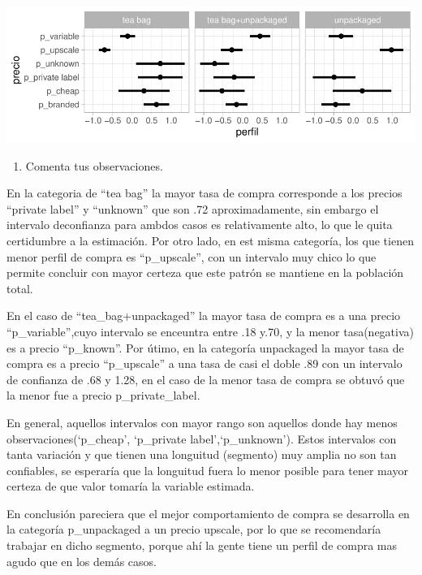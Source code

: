 \documentclass[]{article}
\providecommand{\tightlist}{%
  \setlength{\itemsep}{0pt}\setlength{\parskip}{0pt}}
\begin{document}
\includegraphics{ExamenParcial_files/figure-latex/perfiles_intervalos_grafica, -1.pdf}

\begin{enumerate}
\def\labelenumi{\arabic{enumi}.}
\setcounter{enumi}{2}
\tightlist
\item
  Comenta tus observaciones.
\end{enumerate}

En la categoria de ``tea bag'' la mayor tasa de compra corresponde a los
precios ``private label'' y ``unknown'' que son .72 aproximadamente, sin
embargo el intervalo deconfianza para ambdos casos es relativamente
alto, lo que le quita certidumbre a la estimación. Por otro lado, en est
misma categoría, los que tienen menor perfil de compra es
``p\_upscale'', con un intervalo muy chico lo que permite concluir con
mayor certeza que este patrón se mantiene en la población total.

En el caso de ``tea\_bag+unpackaged'' la mayor tasa de compra es a una
precio ``p\_variable'',cuyo intervalo se enceuntra entre .18 y.70, y la
menor tasa(negativa) es a precio ``p\_known''. Por útimo, en la
categoría unpackaged la mayor tasa de compra es a precio ``p\_upscale''
a una tasa de casi el doble .89 con un intervalo de confianza de .68 y
1.28, en el caso de la menor tasa de compra se obtuvó que la menor fue a
precio p\_private\_label.

En general, aquellos intervalos con mayor rango son aquellos donde hay
menos observaciones(`p\_cheap', `p\_private label',`p\_unknown'). Estos
intervalos con tanta variación y que tienen una longuitud (segmento) muy
amplia no son tan confiables, se esperaría que la longuitud fuera lo
menor posible para tener mayor certeza de que valor tomaría la variable
estimada.

En conclusión pareciera que el mejor comportamiento de compra se
desarrolla en la categoría p\_unpackaged a un precio upscale, por lo que
se recomendaría trabajar en dicho segmento, porque ahí la gente tiene un
perfil de compra mas agudo que en los demás casos.
\end{document}
